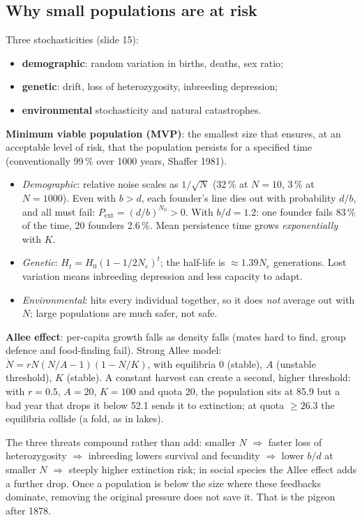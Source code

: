 \subsection{Why small populations are at risk}
Three stochasticities (slide 15):
\begin{itemize}
\item \textbf{demographic}: random variation in births, deaths, sex ratio;
\item \textbf{genetic}: drift, loss of heterozygosity, inbreeding depression;
\item \textbf{environmental} stochasticity and natural catastrophes.
\end{itemize}
\textbf{Minimum viable population (MVP)}: the smallest size that ensures, at an acceptable level of risk, that the
population persists for a specified time (conventionally 99\,\% over 1000 years, Shaffer 1981).

\begin{chain}
\begin{itemize}
\item \emph{Demographic}: relative noise scales as $1/\sqrt N$ (32\,\% at $N=10$, 3\,\% at $N=1000$). Even with $b>d$, each
founder's line dies out with probability $d/b$, and all must fail: $P_{\text{ext}}=(d/b)^{N_0}>0$. With $b/d=1.2$: one
founder fails 83\,\% of the time, 20 founders 2.6\,\%. Mean persistence time grows \emph{exponentially} with $K$.
\item \emph{Genetic}: $H_t=H_0(1-1/2N_e)^t$; the half-life is $\approx1.39N_e$ generations. Lost variation means
inbreeding depression and less capacity to adapt.
\item \emph{Environmental}: hits every individual together, so it does \emph{not} average out with $N$; large
populations are much safer, not safe.
\end{itemize}
\end{chain}

\textbf{Allee effect}: per-capita growth falls as density falls (mates hard to find, group defence and food-finding fail).
Strong Allee model: $\dot N=rN(N/A-1)(1-N/K)$, with equilibria 0 (stable), $A$ (unstable threshold), $K$ (stable). A
constant harvest can create a second, higher threshold: with $r=0.5$, $A=20$, $K=100$ and quota 20, the population
sits at 85.9 but a bad year that drops it below 52.1 sends it to extinction; at quota $\ge26.3$ the equilibria collide
(a fold, as in lakes).

\begin{keyidea}
The three threats compound rather than add: smaller $N$ $\Rightarrow$ faster loss of heterozygosity $\Rightarrow$
inbreeding lowers survival and fecundity $\Rightarrow$ lower $b/d$ at smaller $N$ $\Rightarrow$ steeply higher extinction
risk; in social species the Allee effect adds a further drop. Once a population is below the size where these feedbacks
dominate, removing the original pressure does not save it. That is the pigeon after 1878.
\end{keyidea}

